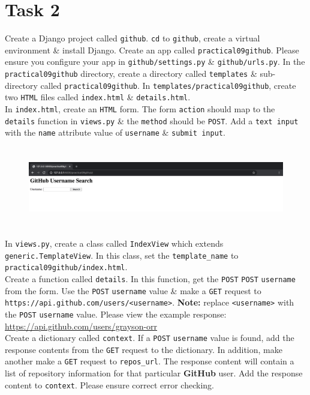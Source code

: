 \documentclass{article}
\begin{document}
\section*{Task 2} 
Create a Django project called \texttt{github}. \texttt{cd} to \texttt{github}, create a virtual environment \& install Django. Create an app called \texttt{practical09github}. Please ensure you configure your app in \texttt{github/settings.py} \& \texttt{github/urls.py}. In the \texttt{practical09github} directory, create a directory called \texttt{templates} \& sub-directory called \texttt{practical09github}. In \texttt{templates/practical09github}, create two \texttt{HTML} files called \texttt{index.html} \& \texttt{details.html}. \\

In \texttt{index.html}, create an \texttt{HTML} form. The form \texttt{action} should map to the \texttt{details} function in \texttt{views.py} \& the \texttt{method} should be \texttt{POST}. Add a \texttt{text input} with the \texttt{name} attribute value of \texttt{username} \& \texttt{submit input}. 
\begin{figure}[H]
  \includegraphics[width=175mm, height=35mm]{./img/09-expected-github-1.png}
\end{figure}

In \texttt{views.py}, create a class called \texttt{IndexView} which extends \texttt{generic.TemplateView}. In this class, set the \texttt{template\_name} to \texttt{practical09github/index.html}. \\

Create a function called \texttt{details}. In this function, get the \texttt{POST} \texttt{POST} \texttt{username} from the form. Use the \texttt{POST} \texttt{username} value \& make a \texttt{GET} request to \texttt{https://api.github.com/users/<username>}. \textbf{Note:} replace \texttt{<username>} with the \texttt{POST} \texttt{username} value. Please view the example response: \href{https://api.github.com/users/grayson-orr}{https://api.github.com/users/grayson-orr} \\

Create a dictionary called \texttt{context}. If a \texttt{POST} \texttt{username} value is found, add the response contents from the \texttt{GET} request to the dictionary. In addition, make another make a \texttt{GET} request to \texttt{repos\_url}. The response content will contain a list of repository information for that particular \textbf{GitHub} user. Add the response content to \texttt{context}. Please ensure correct error checking. \\
\end{document}
